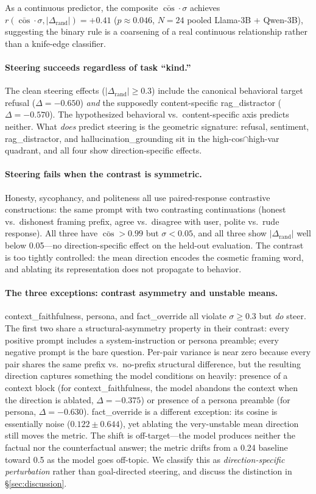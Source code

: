 \documentclass{article}
\begin{document}
As a continuous predictor, the composite
$\bar{\cos} \cdot \sigma$ achieves
$r(\bar{\cos} \cdot \sigma, |\Delta_{\text{rand}}|) = +0.41$
($p \approx 0.046$, $N{=}24$ pooled Llama-3B + Qwen-3B), suggesting
the binary rule is a coarsening of a real continuous relationship
rather than a knife-edge classifier.

\paragraph{Steering succeeds regardless of task ``kind.''}
The clean steering effects
($|\Delta_{\text{rand}}| \geq 0.3$) include the canonical behavioral
target refusal ($\Delta = -0.650$) \emph{and} the supposedly
content-specific rag\_distractor ($\Delta = -0.570$). The
hypothesized behavioral vs.~content-specific axis predicts neither.
What \emph{does} predict steering is the geometric signature:
refusal, sentiment, rag\_distractor, and hallucination\_grounding
sit in the high-cos$\cap$high-var quadrant, and all four show
direction-specific effects.

\paragraph{Steering fails when the contrast is symmetric.}
Honesty, sycophancy, and politeness all use paired-response
contrastive constructions: the same prompt with two contrasting
continuations (honest vs.~dishonest framing prefix, agree
vs.~disagree with user, polite vs.~rude response). All three have
$\bar{\cos} > 0.99$ but $\sigma < 0.05$, and all three show
$|\Delta_{\text{rand}}|$ well below 0.05---no direction-specific
effect on the held-out evaluation. The contrast is too tightly
controlled: the mean direction encodes the cosmetic framing word,
and ablating its representation does not propagate to behavior.

\paragraph{The three exceptions: contrast asymmetry and unstable
means.}
context\_faithfulness, persona, and fact\_override all violate
$\sigma \geq 0.3$ but \emph{do} steer. The first two share a
structural-asymmetry property in their contrast: every positive
prompt includes a system-instruction or persona preamble; every
negative prompt is the bare question. Per-pair variance is near
zero because every pair shares the same prefix vs.~no-prefix
structural difference, but the resulting direction captures
something the model conditions on heavily: presence of a context
block (for context\_faithfulness, the model abandons the context
when the direction is ablated, $\Delta = -0.375$) or presence of a
persona preamble (for persona, $\Delta = -0.630$).
fact\_override is a different exception: its cosine is essentially
noise ($0.122 \pm 0.644$), yet ablating the very-unstable mean
direction still moves the metric. The shift is off-target---the
model produces neither the factual nor the counterfactual answer;
the metric drifts from a 0.24 baseline toward 0.5 as the model goes
off-topic. We classify this as \emph{direction-specific perturbation}
rather than goal-directed steering, and discuss the distinction in
\S\ref{sec:discussion}.
\end{document}
